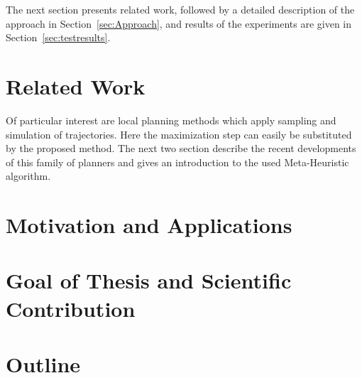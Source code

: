 The next section presents related work, followed by a detailed description of the approach in Section~\ref{sec:Approach}, and results of the experiments are given in Section~\ref{sec:testresults}. 
\section{Related Work} \label{sec:RelatedWork}
Of particular interest are local planning methods which apply sampling and simulation of trajectories. 
Here the maximization step can easily be substituted by the proposed method. The next two section describe the recent developments of this family of planners and gives an introduction to the used Meta-Heuristic algorithm.

\section{Motivation and Applications}\label{sec:motivation}

\section{Goal of Thesis and Scientific Contribution}\label{sec:goal}

\section{Outline}\label{sec:outline}




